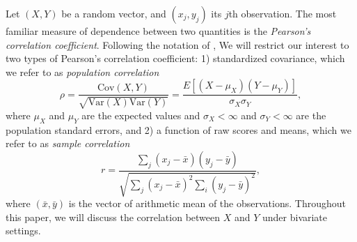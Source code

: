\documentclass[12pt, a4paper]{article}
\newcommand{\cov}{\text{Cov}}
\newcommand{\var}{\text{Var}}
\newcommand{\samplecor}{sample correlation}
\newcommand{\popucor}{population correlation}
\begin{document}
	Let $(X, Y)$ be a random vector, and $(x_j, y_j)$ its $j$th observation. The most familiar measure of dependence between two quantities is the \textit{Pearson's correlation coefficient}.  Following the notation of \citet{lee1988thirteen}, We will restrict our interest to two types of Pearson's correlation coefficient: 1) standardized covariance, which we refer to as \textit{\popucor}
	\begin{equation}\label{eq:popucor}
		\rho =\dfrac{\cov(X, Y)}{\sqrt{\var(X)\var(Y)}} = \dfrac{E[(X-\mu_X)(Y-\mu_Y)]}{\sigma_X\sigma_Y}, 
	\end{equation} 	where $\mu_X$ and $\mu_Y$ are the expected values and $\sigma_X<\infty$ and $\sigma_Y<\infty$ are the population standard errors, and 2) a function of raw scores and means, which we refer to as \textit{\samplecor}
	\begin{equation}\label{eq:samplecor}
	r  =  \dfrac{\sum_j (x_j -\bar{x})(y_j - \bar{y})}{\sqrt{\sum_{j}(x_j - \bar{x})^2\sum_i(y_j - \bar{y})^2}}, 
	\end{equation}
	where $(\bar{x}, \bar{y})$ is the vector of arithmetic mean of the observations.
	Throughout this paper, we will discuss the correlation between $X$ and $Y$ under bivariate settings. 
\end{document}
